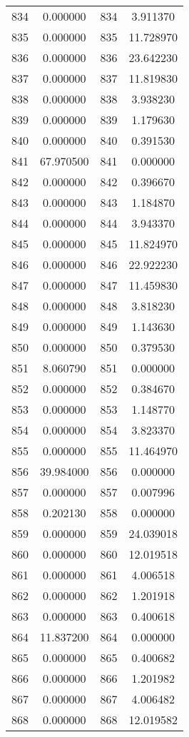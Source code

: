 \documentclass[12pt]{article}
\begin{document}
\begin{longtable}{@{}cccc@{}}
834 & 0.000000 & 834 & 3.911370 \\
835 & 0.000000 & 835 & 11.728970 \\
836 & 0.000000 & 836 & 23.642230 \\
837 & 0.000000 & 837 & 11.819830 \\
838 & 0.000000 & 838 & 3.938230 \\
839 & 0.000000 & 839 & 1.179630 \\
840 & 0.000000 & 840 & 0.391530 \\
841 & 67.970500 & 841 & 0.000000 \\
842 & 0.000000 & 842 & 0.396670 \\
843 & 0.000000 & 843 & 1.184870 \\
844 & 0.000000 & 844 & 3.943370 \\
845 & 0.000000 & 845 & 11.824970 \\
846 & 0.000000 & 846 & 22.922230 \\
847 & 0.000000 & 847 & 11.459830 \\
848 & 0.000000 & 848 & 3.818230 \\
849 & 0.000000 & 849 & 1.143630 \\
850 & 0.000000 & 850 & 0.379530 \\
851 & 8.060790 & 851 & 0.000000 \\
852 & 0.000000 & 852 & 0.384670 \\
853 & 0.000000 & 853 & 1.148770 \\
854 & 0.000000 & 854 & 3.823370 \\
855 & 0.000000 & 855 & 11.464970 \\
856 & 39.984000 & 856 & 0.000000 \\
857 & 0.000000 & 857 & 0.007996 \\
858 & 0.202130 & 858 & 0.000000 \\
859 & 0.000000 & 859 & 24.039018 \\
860 & 0.000000 & 860 & 12.019518 \\
861 & 0.000000 & 861 & 4.006518 \\
862 & 0.000000 & 862 & 1.201918 \\
863 & 0.000000 & 863 & 0.400618 \\
864 & 11.837200 & 864 & 0.000000 \\
865 & 0.000000 & 865 & 0.400682 \\
866 & 0.000000 & 866 & 1.201982 \\
867 & 0.000000 & 867 & 4.006482 \\
868 & 0.000000 & 868 & 12.019582 \\

\end{longtable}
\end{document}
